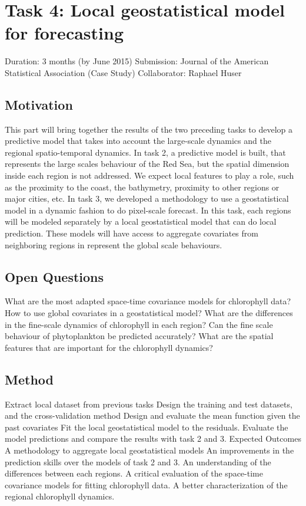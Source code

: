 
\section{Task 4: Local geostatistical model for forecasting}

Duration: 3 months (by June 2015)
Submission: Journal of the American Statistical Association (Case Study)
Collaborator: Raphael Huser

\subsection{Motivation}

This part will bring together the results of the two preceding tasks to develop a predictive model that takes into account the large-scale dynamics and the regional spatio-temporal dynamics. In task 2, a predictive model is built, that represents the large scales behaviour of the Red Sea, but the spatial dimension inside each region is not addressed. We expect local features to play a role, such as the proximity to the coast, the bathymetry, proximity to other regions or major cities, etc. In task 3, we developed a methodology to use a geostatistical model in a dynamic fashion to do pixel-scale forecast. In this task, each regions will be modeled separately by a local geostatistical model that can do local prediction. These models will have access to aggregate covariates from neighboring regions in represent the global scale behaviours. 

\subsection{Open Questions}

What are the most adapted space-time covariance models for chlorophyll data?
How to use global covariates in a geostatistical model?
What are the differences in the fine-scale dynamics of chlorophyll in each region?
Can the fine scale behaviour of phytoplankton be predicted accurately?
What are the spatial features that are important for the chlorophyll dynamics?

\subsection{Method}

Extract local dataset from previous tasks
Design the training and test datasets, and the cross-validation method
Design and evaluate the mean function given the past covariates
Fit the local geostatistical model to the residuals.
Evaluate the model predictions and compare the results with task 2 and 3.
Expected Outcomes
A methodology to aggregate local geostatistical models
An improvements in the prediction skills over the models of task 2 and 3.
An understanding of the differences between each regions.
A critical evaluation of the space-time covariance models for fitting chlorophyll data.
A better characterization of the regional chlorophyll dynamics.

